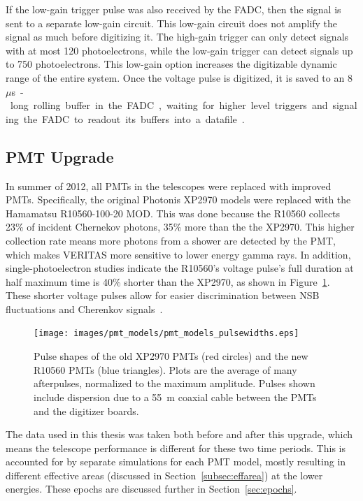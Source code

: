 If the low-gain trigger pulse was also received by the FADC, then the signal is sent to a separate low-gain circuit.
This low-gain circuit does not amplify the signal as much before digitizing it.
The high-gain trigger can only detect signals with at most 120 photoelectrons, while the low-gain trigger can detect signals up to 750 photoelectrons.
This low-gain option increases the digitizable dynamic range of the entire system.
Once the voltage pulse is digitized, it is saved to an \SI{8}{$\mu$s}-long rolling buffer in the FADC, waiting for higher level triggers and signaling the FADC to readout its buffers into a datafile~\cite{Veritas_Detector,veritas_FADC}.

\subsection{PMT Upgrade}
In summer of 2012, all PMTs in the telescopes were replaced with improved PMTs.
Specifically, the original Photonis XP2970 models were replaced with the Hamamatsu R10560-100-20 MOD.
This was done because the R10560 collects 23\% of incident Chernekov photons, 35\% more than the the XP2970.
This higher collection rate means more photons from a shower are detected by the PMT, which makes VERITAS more sensitive to lower energy gamma rays.
In addition, single-photoelectron studies indicate the R10560's voltage pulse's full duration at half maximum time is \nicetilde{}40\% shorter than the XP2970, as shown in Figure~\ref{fig:pmt_pulse_widths}.
These shorter voltage pulses allow for easier discrimination between NSB fluctuations and Cherenkov signals~\cite{pmtmodels}.

\begin{figure}[ht]
  \centering
  \texttt{[image: images/pmt\_models/pmt\_models\_pulsewidths.eps]}
  \caption[Pulse Shapes]{
    Pulse shapes of the old XP2970 PMTs (red circles) and the new R10560 PMTs (blue triangles).
    Plots are the average of many afterpulses, normalized to the maximum amplitude.
    Pulses shown include dispersion due to a \nicetilde{}\SI{55}{m} coaxial cable between the PMTs and the digitizer boards.~\cite{pmtmodels}}
  \label{fig:pmt_pulse_widths}
\end{figure}

The data used in this thesis was taken both before and after this upgrade, which means the telescope performance is different for these two time periods.
This is accounted for by separate simulations for each PMT model, mostly resulting in different effective areas (discussed in Section~\ref{subsec:effarea}) at the lower energies.
These epochs are discussed further in Section~\ref{sec:epochs}.


